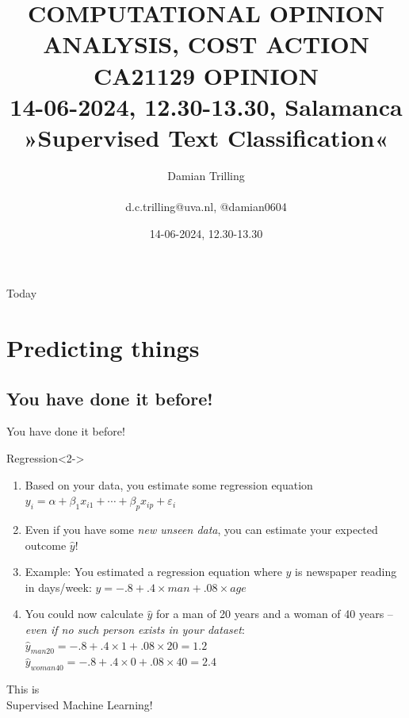 \documentclass[compress]{beamer}
\title[ML in PYthon]{\textbf{COMPUTATIONAL OPINION ANALYSIS, COST ACTION CA21129 OPINION} \\14-06-2024, 12.30-13.30, Salamanca\\ »Supervised Text Classification«}
\author[Damian Trilling]{Damian Trilling \\ ~ \\ \footnotesize{d.c.trilling@uva.nl, @damian0604} \\}
\date{14-06-2024, 12.30-13.30}
\institute[VU]{Vrije Universiteit Amsterdam}
\begin{document}
	
	\begin{frame}{}
		\titlepage
	\end{frame}
	
	\begin{frame}{Today}
		\tableofcontents
	\end{frame}
	
	



\section{Predicting things}






\subsection{You have done it before!}
\begin{frame}{You have done it before!}
	\begin{block}{Regression}<2->
		\begin{enumerate}
			\item<3-> Based on your data, you estimate some regression equation 	$y_i = \alpha + \beta_1 x_{i1} + \cdots + \beta_p x_{ip} + \varepsilon_i$
			\item<4-> Even if you have some \emph{new unseen data}, you can estimate your expected outcome $\hat{y}$!
			\item<5-> Example: You estimated a regression equation where $y$ is newspaper reading in days/week: $y = -.8 + .4 \times man + .08 \times age$
			\item<6-> You could now calculate $\hat{y}$ for a man of 20 years and a woman of 40 years -- \emph{even if no such person exists in your dataset}: \\
			$\hat{y}_{man20} = -.8 + .4 \times 1 + .08 \times 20 = 1.2$ \\
			$\hat{y}_{woman40} = -.8 + .4 \times 0 + .08 \times 40 = 2.4$
		\end{enumerate}
	\end{block}	
	
\end{frame}



\begin{frame}{}
	\huge{This is\\ Supervised Machine Learning!}
\end{frame}
\end{document}
